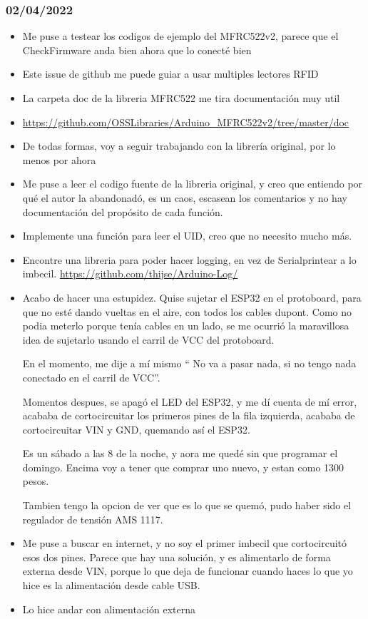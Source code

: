 \documentclass[../informe_krapp.tex]{subfiles}
\begin{document}
\subsubsection*{02/04/2022}
\begin{itemize}
	\item Me puse a testear los codigos de ejemplo del MFRC522v2, parece que el
	      CheckFirmware anda bien ahora que lo conecté bien
	\item Este issue de github me puede guiar a usar multiples lectores RFID
	\item La carpeta doc de la libreria MFRC522 me tira documentación muy util
	\item \url{https://github.com/OSSLibraries/Arduino_MFRC522v2/tree/master/doc}
	\item De todas formas, voy a seguir trabajando con la librería original, por lo menos
	      por ahora
	\item Me puse a leer el codigo fuente de la libreria original, y creo que entiendo por
	      qué el autor la abandonadó, es un caos, escasean los comentarios
	      y no hay documentación del propósito de cada función.
	\item Implemente una función para leer el UID, creo que no necesito mucho más.

	\item Encontre una libreria para poder hacer logging, en vez de Serialprintear a
	      lo imbecil. \url{https://github.com/thijse/Arduino-Log/}

	\item Acabo de hacer una estupidez. Quise sujetar el ESP32 en el protoboard,
	      para que no esté dando vueltas en el aire, con todos los cables dupont.
	      Como no podia meterlo porque tenía cables en un lado, se me ocurrió la
	      maravillosa idea de sujetarlo usando el carril de VCC del protoboard.

	      En el momento, me dije a mí mismo `` No va a pasar nada, si no tengo nada
	      conectado en el carril de VCC''.

	      Momentos despues, se apagó el LED del ESP32, y me dí cuenta de mí error,
	      acababa de cortocircuitar los primeros pines de la fila izquierda,
	      acababa de cortocircuitar VIN y GND, quemando así el ESP32.

	      Es un sábado a las 8 de la noche, y aora me quedé sin que programar el domingo.
	      Encima voy a tener que comprar uno nuevo, y estan como 1300 pesos.

	      Tambien tengo la opcion de ver que es lo que se quemó, pudo haber sido
	      el regulador de tensión AMS 1117.

	\item Me puse a buscar en internet, y no soy el primer imbecil que cortocircuitó
	      esos dos pines. Parece que hay una solución, y es alimentarlo de forma externa
	      desde VIN, porque lo que deja de funcionar cuando haces lo que yo hice
	      es la alimentación desde cable USB.

	\item Lo hice andar con alimentación externa
\end{itemize}
\end{document}
